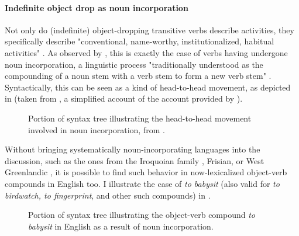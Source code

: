 \paragraph{Indefinite object drop as noun incorporation}

Not only do (indefinite) object-dropping transitive verbs describe activities, they specifically describe "conventional, name-worthy, institutionalized, habitual activities" \parencite[119]{Dvorak2017thesis}. As observed by \textcite{Marti2010, Marti2015, Yasutake1987, BourmayanRecanati2013}, this is exactly the case of verbs having undergone noun incorporation, a linguistic process "traditionally understood as the compounding of a noun stem with a verb stem to form a new verb stem" \parencite[5]{mithun2009polysynthesis}. Syntactically, this can be seen as a kind of head-to-head movement, as depicted in  (taken from \textcite[495]{carnie2021syntax}, a simplified account of the account provided by \textcite{baker1988theta}).

\begin{figure}[htb]
\caption{Portion of syntax tree illustrating the head-to-head movement involved in noun incorporation, from \textcite[495]{carnie2021syntax}.}
\end{figure}

Without bringing systematically noun-incorporating languages into the discussion, such as the ones from the Iroquoian family \parencite{mithun2009polysynthesis}, Frisian, or West Greenlandic \parencite{Marti2015}, it is possible to find such behavior in now-lexicalized object-verb compounds in English too. I illustrate the case of \textit{to babysit} (also valid for \textit{to birdwatch, to fingerprint}, and other such compounds) in .

\begin{figure}[htb]
\caption{Portion of syntax tree illustrating the object-verb compound \textit{to babysit} in English as a result of noun incorporation.}
\end{figure}

